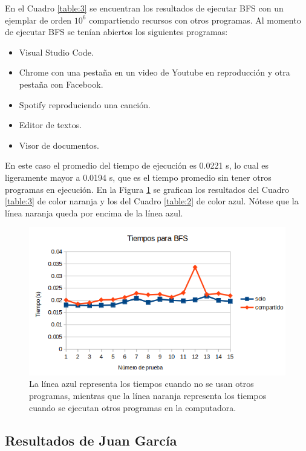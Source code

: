 \documentclass{article}
\begin{document}
En el Cuadro \ref{table:3} se encuentran los resultados de ejecutar BFS con un ejemplar de orden $10^6$ compartiendo recursos con otros programas. Al momento de ejecutar BFS se tenían abiertos los siguientes programas:

\begin{itemize}
\item Visual Studio Code.
\item Chrome con una pestaña en un video de Youtube en reproducción y otra pestaña con Facebook.
\item Spotify reproduciendo una canción.
\item Editor de textos.
\item Visor de documentos.
\end{itemize}

En este caso el promedio del tiempo de ejecución es 0.0221 s, lo cual es ligeramente mayor a 0.0194 s, que es el tiempo promedio sin tener otros programas en ejecución. En la Figura \ref{fig:grafico2} se grafican los resultados del Cuadro \ref{table:3} de color naranja y los del Cuadro \ref{table:2} de color azul. Nótese que la línea naranja queda por encima de la línea azul.

\begin{figure}[htbp]

\center

\includegraphics[scale=0.5]{imagenes/grafico2}

\caption{La línea azul representa los tiempos cuando no se usan otros programas, mientras que la línea naranja representa los tiempos cuando se ejecutan otros programas en la computadora.} \label{fig:grafico2}

\end{figure}

\subsection{Resultados de Juan García}
\end{document}
